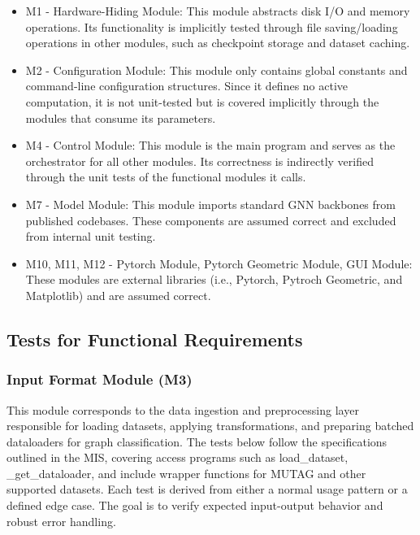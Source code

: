 \documentclass[12pt, titlepage]{article}
\begin{document}
\begin{itemize}
  \item M1 - Hardware-Hiding Module: This module abstracts disk I/O and memory operations. Its functionality is implicitly tested through file saving/loading operations in other modules, such as checkpoint storage and dataset caching.
  
  \item M2 - Configuration Module: This module only contains global constants and command-line configuration structures. Since it defines no active computation, it is not unit-tested but is covered implicitly through the modules that consume its parameters.
  
  \item M4 - Control Module: This module is the main program and serves as the orchestrator for all other modules. Its correctness is indirectly verified through the unit tests of the functional modules it calls.
  
  \item M7 - Model Module: This module imports standard GNN backbones from published codebases. These components are assumed correct and excluded from internal unit testing.
  \item M10, M11, M12 - Pytorch Module, Pytorch Geometric Module, GUI Module: These modules are external libraries (i.e., Pytorch, Pytroch Geometric, and Matplotlib) and are assumed correct.
\end{itemize}




\subsection{Tests for Functional Requirements}
\label{sub:unit FR}

\subsubsection{Input Format Module (M3)}

This module corresponds to the data ingestion and preprocessing layer responsible for loading datasets, applying transformations, and preparing batched dataloaders for graph classification. The tests below follow the specifications outlined in the MIS, covering access programs such as load\_dataset, \_get\_dataloader, and include wrapper functions for MUTAG \citep{debnath1991structure} and other supported datasets. Each test is derived from either a normal usage pattern or a defined edge case. The goal is to verify expected input-output behavior and robust error handling.
\end{document}
